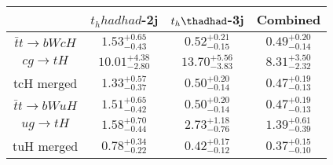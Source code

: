 \centering
\begin{tabular}{|c|c|c|c|} \hline
 & $t_h	hadhad$-2j & $t_h\thadhad$-3j & Combined\\\hline
$\bar{t}t\to bWcH$ & $1.53^{+0.65}_{-0.43}$ & $0.52^{+0.21}_{-0.15}$ & $0.49^{+0.20}_{-0.14}$\\\hline
$cg\to tH$ & $10.01^{+4.38}_{-2.80}$ & $13.70^{+5.56}_{-3.83}$ & $8.31^{+3.50}_{-2.32}$\\\hline
tcH merged & $1.33^{+0.57}_{-0.37}$ & $0.50^{+0.20}_{-0.14}$ & $0.47^{+0.19}_{-0.13}$\\\hline
$\bar{t}t\to bWuH$ & $1.51^{+0.65}_{-0.42}$ & $0.50^{+0.20}_{-0.14}$ & $0.47^{+0.19}_{-0.13}$\\\hline
$ug\to tH$ & $1.58^{+0.70}_{-0.44}$ & $2.73^{+1.18}_{-0.76}$ & $1.39^{+0.61}_{-0.39}$\\\hline
tuH merged & $0.78^{+0.34}_{-0.22}$ & $0.42^{+0.17}_{-0.12}$ & $0.37^{+0.15}_{-0.10}$\\\hline
\end{tabular}
